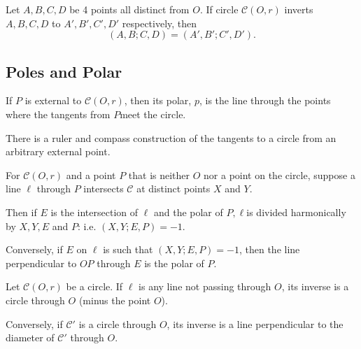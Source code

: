 \begin{theorem}
    Let \(A, B, C, D\) be 4 points all distinct from \(O\). If circle \(\mathcal{C}(O, r)\) inverts \(A, B, C, D\) to \(A', B', C', D'\) respectively, then
    \[(A, B; C, D) = (A', B'; C', D').\]
\end{theorem}

\subsection{Poles and Polar}


\begin{theorem}
    If \(P\) is external to \(\mathcal{C}(O, r)\), then its polar, \(p\), is the line through the points where the tangents from \(P\)meet the circle.
\end{theorem}

\begin{corollary}
    There is a ruler and compass construction of the tangents to a circle from an arbitrary external point.
\end{corollary}

\begin{theorem}
    \setlength{\parindent}{1em}
    For \(\mathcal{C}(O, r)\) and a point \(P\) that is neither \(O\) nor a point on the circle, suppose a line \(\ell\) through \(P\) intersects \(\mathcal{C}\) at distinct points \(X\) and \(Y\).

    Then if \(E\) is the intersection of \(\ell\) and the polar of \(P, \ell\)is divided harmonically by \(X, Y, E\) and \(P\): i.e. \((X, Y; E, P) = -1\).

    Conversely, if \(E\) on \(\ell\) is such that \((X, Y; E, P) = -1\), then the line perpendicular to \(OP\) through \(E\) is the polar of \(P\).
\end{theorem}

\begin{theorem}
    \setlength{\parindent}{1em}
    Let \(\mathcal{C}(O, r)\) be a circle. If \(\ell\) is any line not passing through \(O\), its inverse is a circle through \(O\) (minus the point \(O\)).

    Conversely, if \(\mathcal{C}'\) is a circle through \(O\), its inverse is a line perpendicular to the diameter of \(\mathcal{C}'\) through \(O\).
\end{theorem}

